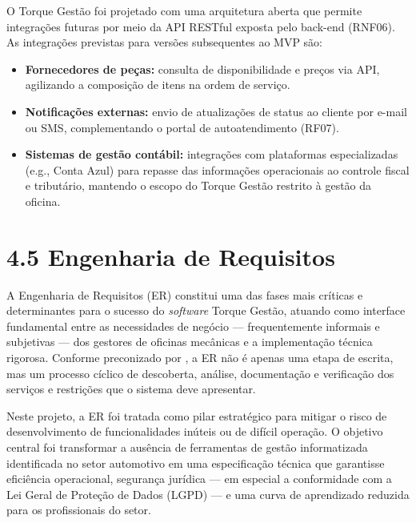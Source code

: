\documentclass[12pt, a4paper]{article}
\begin{document}
O Torque Gest\~ao foi projetado com uma arquitetura aberta que permite integrações futuras
por meio da API RESTful exposta pelo back-end (RNF06). As integrações previstas para
vers\~oes subsequentes ao MVP s\~ao:

\begin{itemize}[leftmargin=2cm, itemsep=4pt]
  \item \textbf{Fornecedores de pe\c{c}as:} consulta de disponibilidade e pre\c{c}os via
        API, agilizando a composi\c{c}\~ao de itens na ordem de servi\c{c}o.
  \item \textbf{Notifica\c{c}\~oes externas:} envio de atualiza\c{c}\~oes de status ao
        cliente por e-mail ou SMS, complementando o portal de autoatendimento (RF07).
  \item \textbf{Sistemas de gest\~ao cont\'abil:} integrações com plataformas
        especializadas (e.g., Conta Azul) para repasse das informa\c{c}\~oes operacionais
        ao controle fiscal e tribut\'ario, mantendo o escopo do Torque Gest\~ao restrito
        \`a gest\~ao da oficina.
\end{itemize}


\section{4.5 Engenharia de Requisitos}

A Engenharia de Requisitos (ER) constitui uma das fases mais críticas e
determinantes para o sucesso do \textit{software} Torque Gestão, atuando como
interface fundamental entre as necessidades de negócio — frequentemente
informais e subjetivas — dos gestores de oficinas mecânicas e a implementação
técnica rigorosa. Conforme preconizado por , a ER
não é apenas uma etapa de escrita, mas um processo cíclico de descoberta,
análise, documentação e verificação dos serviços e restrições que o sistema
deve apresentar.

Neste projeto, a ER foi tratada como pilar estratégico para mitigar o risco de
desenvolvimento de funcionalidades inúteis ou de difícil operação. O objetivo
central foi transformar a ausência de ferramentas de gestão informatizada
identificada no setor automotivo em uma especificação técnica que garantisse
eficiência operacional, segurança jurídica — em especial a conformidade com a
Lei Geral de Proteção de Dados (LGPD) — e uma curva de aprendizado reduzida
para os profissionais do setor.
\end{document}
